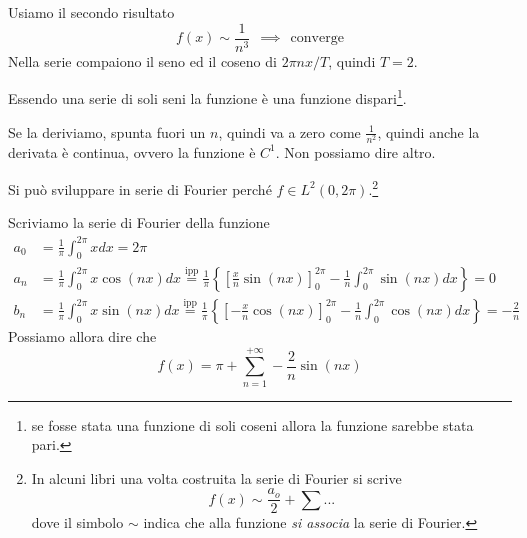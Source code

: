 Usiamo il secondo risultato
\begin{equation*}
f( x) \sim \frac{1}{n^{3}} \ \ \implies \ \ \text{converge}
\end{equation*}
Nella serie compaiono il seno ed il coseno di $2\pi nx/T$, quindi $T=2$.

Essendo una serie di soli seni la funzione è una funzione dispari\footnote{se fosse stata una funzione di soli coseni allora la funzione sarebbe stata pari.}.

Se la deriviamo, spunta fuori un $n$, quindi va a zero come $\frac{1}{n^{2}}$, quindi anche la derivata è continua, ovvero la funzione è $C^{1}$. Non possiamo dire altro.
\Soluzione

Si può sviluppare in serie di Fourier perché $f\in L^{2}( 0,2\pi )$.\footnote{In alcuni libri una volta costruita la serie di Fourier si scrive 
\begin{equation*}
f(x)\sim \frac{a_{o}}{2} +\sum ...
\end{equation*}
dove il simbolo $\sim $ indica che alla funzione \textit{si associa} la serie di Fourier.}

Scriviamo la serie di Fourier della funzione
\begin{equation*}
\begin{aligned}
a_{0} & =\frac{1}{\pi }\int ^{2\pi }_{0} xdx=2\pi \\
a_{n} & =\frac{1}{\pi }\int ^{2\pi }_{0} x\cos (nx)dx\overset{\text{ipp}}{=}\frac{1}{\pi }\left\{\left[\frac{x}{n}\sin (nx)\right]^{2\pi }_{0} -\frac{1}{n}\int ^{2\pi }_{0}\sin (nx)dx\right\} =0\\
b_{n} & =\frac{1}{\pi }\int ^{2\pi }_{0} x\sin (nx)dx\overset{\text{ipp}}{=}\frac{1}{\pi }\left\{\left[ -\frac{x}{n}\cos (nx)\right]^{2\pi }_{0} -\frac{1}{n}\int ^{2\pi }_{0}\cos (nx)dx\right\} =-\frac{2}{n}
\end{aligned}
\end{equation*}
Possiamo allora dire che
\begin{equation*}
f(x)=\pi +\sum ^{+\infty }_{n=1} -\frac{2}{n}\sin (nx)
\end{equation*}

